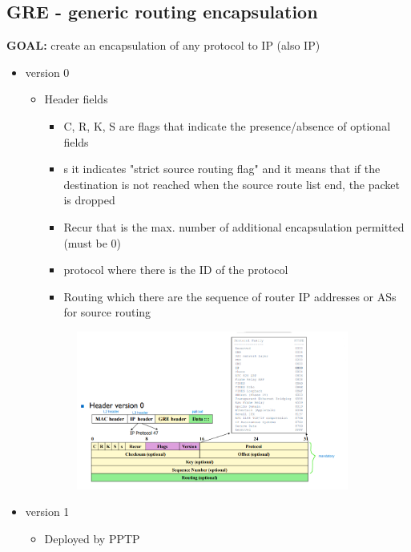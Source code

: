 \documentclass{article}
\begin{document}
\subsection{GRE - generic routing encapsulation}
\textbf{GOAL:} create an encapsulation of any protocol to IP (also IP)
\begin{itemize}   
    \item version 0
    \begin{itemize}
        \item Header fields 
        \begin{itemize}
            \item C, R, K, S are flags that indicate the presence/absence of optional fields
            \item s it indicates "strict source routing flag" and it means that if the destination is not reached when the source route list end, the packet is dropped
            \item Recur that is the max. number of additional encapsulation permitted (must be 0)
            \item protocol where there is the ID of the protocol
            \item Routing which there are the sequence of router IP addresses or ASs for source routing
        \end{itemize}
        \begin{figure}[H]
            \centering
            \includegraphics[width=0.90\textwidth]{figure/GRE_header_0.png}
        \end{figure}
    \end{itemize}
    \item version 1
    \begin{itemize}
        \item Deployed by PPTP
        \begin{itemize}

\end{itemize}
\end{itemize}
\end{itemize}
\end{document}
